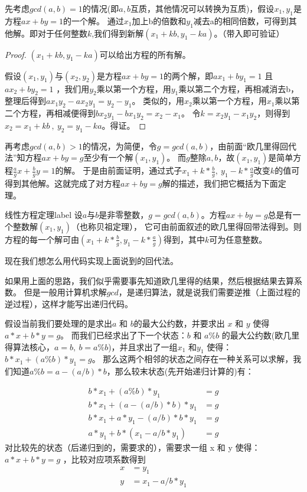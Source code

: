 先考虑$gcd(a,b)=1$的情况(即$a,b$互质，其他情况可以转换为互质)，假设$x_1,y_1$是方程$ax+by=1$的一个解。
通过$x_1$加上b的倍数和$y_1$减去a的相同倍数，可得到其他解。即对于任何整数$k$,我们得到新解$(x_{1}+kb,y_{1}-ka)$。（带入即可验证）

\begin{proof}
	$(x_{1}+kb,y_{1}-ka)$可以给出方程的{\heiti 所有}解。
	
	假设$(x_{1},y_{1})$与$(x_{2},y_{2})$是方程$ax+by=1$的两个解，即$ax_{1}+by_{1}=1$ 且$ ax_{2}+by_{2}=1$ ，我们用$y_{2}$乘以第一个方程，用$y_{1}$乘以第二个方程，再相减消去b，整理后得到$ax_{1}y_{2}-ax_{2}y_{1}=y_{2}-y_{1}$。
	类似的，用$x_{2}$乘以第一个方程，用$x_{1}$乘以第二个方程，再相减便得到$bx_{2}y_{1}-bx_{1}y_{2}=x_{2}-x_{1}$。
	令$k=x_{2}y_{1}-x_{1}y_{2}$，则得到$x_{2}=x_{1}+kb \ ,\  y_{2}=y_{1}-ka$。得证。
\end{proof}

\vbox{}

再考虑$gcd(a,b)>1$的情况，为简便，令$g=gcd(a,b)$，由前面“欧几里得回代法”知方程$ax+by=g$至少有一个解$(x_{1},y_{1})$。
{\heiti 而$g$整除$a,b$}，故$(x_{1},y_{1})$是简单方程$\frac{a}{g}x+\frac{b}{g}y=1$的解。
于是由前面证明，通过式子$x_1+k*\frac{b}{g},\ y_1-k*\frac{a}{g}$改变$k$的值可得到其他解。这就完成了对方程$ax+by=g$解的描述，我们把它概括为下面定理。


\begin{theorem}{线性方程定理}{label}
设$a$与$b$是非零整数，$g=gcd(a,b)$。方程$ax+by=g$总是有一个整数解$(x_{1},y_{1})$（也称贝祖定理），
它可由前面叙述的欧几里得回带法得到。则方程的每一个解可由$(x_{1}+k*\frac{b}{g},y_{1}-k*\frac{a}{g})$得到，其中$k$可为任意整数。
\end{theorem}

\vbox{}

现在我们想怎么用代码实现上面说到的回代法。

如果用上面的思路，我们似乎需要事先知道欧几里得的结果，然后根据结果去算系数。
但是一般用计算机求解$gcd$，是递归算法，就是说我们需要逆推（上面过程的逆过程），这样才能写出递归代码。

假设当前我们要处理的是求出$a$ 和 $b$的最大公约数，并要求出 $x$ 和 $y$ 使得 $a * x + b * y=g$。
而我们已经求出了下一个状态：$b$ 和 $a\%b$ 的最大公约数({\heiti 欧几里得算法核心，$a=b,\ b=a\%b$})，并且求出了一组$x_1$ 和$y_1$ 使得：$ b * x_1 + (a\%b) * y_1 = g$。
那么这两个相邻的状态之间存在一种关系可以求解，我们知道$a\%b = a - (a/b)*b$，那么较末状态(先开始递归计算的)有：

\begin{align*}
b * x_1 + (a\%b) * y_1 &= g\\
b*x_{1} + (a-(a/b)*b) * y_{1} &= g \\
b*x_{1} + a*y_{1}-(a/b)*b*y_{1} &=g\\
a*y_{1} + b*(x_{1}-a/b*y_{1})&= g
\end{align*}
对比较先的状态（后递归到的，需要求的），需要求一组 x 和 y 使得：$a*x + b*y = g$ ，比较对应项系数得到
\begin{align*}
x &= y_1\\
y &= x_1 - a/b * y_1 \\
\end{align*}


